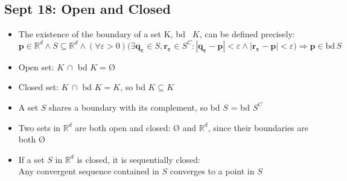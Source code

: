 \documentclass[10pt, oneside]{article}
\newcommand{\R}{\mathbb{R}}
\let \foo \O
\renewcommand{\O}{\text{\foo}}
\renewcommand{\vec}[1]{\mathbf{#1}}
\begin{document}
\subsection{Sept 18: Open and Closed}
\begin{itemize}
    \item The existence of the boundary of a set K, bd \, $K$, can be defined precisely:
    \[\vec{p} \in \R^d \land S \subseteq \R^d \land (\forall \varepsilon > 0) \big( \exists \vec{q_\varepsilon} \in S, \vec{r_\varepsilon} \in S^C: |\vec{q_\varepsilon} - \vec{p}| < \varepsilon \land |\vec{r_\varepsilon} - \vec{p}| < \varepsilon \big) \Rightarrow \vec{p} \in \text{bd} \, S\]
    \item Open set: $K \, \cap$ bd $K = \O$
    \item Closed set: $K \, \cap$ bd $K = K$, so bd $K \subseteq K$
    \item  A set $S$ shares a boundary with its complement, so bd $S$ = bd $S^C$
    \item Two sets in $\R^d$ are both open and closed: $\O$ and $\R^d$, since their boundaries are both $\O$
    \item If a set $S$ in $\R^d$ is closed, it is sequentially closed:\\
    Any convergent sequence contained in $S$ converges to a point in $S$
\end{itemize}
\end{document}
